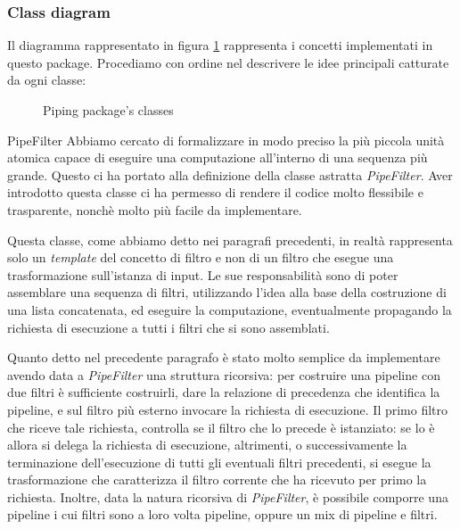 \subsubsection*{Class diagram}
Il diagramma rappresentato in figura \ref{fig:piping-package-classes}
rappresenta i concetti implementati in questo package. Procediamo con
ordine nel descrivere le idee principali catturate da ogni classe:

\begin{figure}
  \centering
  \caption{Piping package's classes}
  \label{fig:piping-package-classes}
\end{figure}

\begin{paragraph}{PipeFilter}
  Abbiamo cercato di formalizzare in modo preciso la pi\`u piccola
  unit\`a atomica capace di eseguire una computazione all'interno di
  una sequenza pi\`u grande. Questo ci ha portato alla definizione
  della classe astratta \emph{PipeFilter}. Aver introdotto questa
  classe ci ha permesso di rendere il codice molto flessibile e
  trasparente, nonch\`e molto pi\`u facile da implementare.

  Questa classe, come abbiamo detto nei paragrafi precedenti, in
  realt\`a rappresenta solo un \emph{template} del concetto di filtro
  e non di un filtro che esegue una trasformazione sull'istanza di
  input. Le sue responsabilit\`a sono di poter assemblare una sequenza
  di filtri, utilizzando l'idea alla base della costruzione di una
  lista concatenata, ed eseguire la computazione, eventualmente
  propagando la richiesta di esecuzione a tutti i filtri che si sono
  assemblati.

  Quanto detto nel precedente paragrafo \`e stato molto semplice da
  implementare avendo data a \emph{PipeFilter} una struttura
  ricorsiva: per costruire una pipeline con due filtri \`e sufficiente
  costruirli, dare la relazione di precedenza che identifica la
  pipeline, e sul filtro pi\`u esterno invocare la richiesta di
  esecuzione. Il primo filtro che riceve tale richiesta, controlla se
  il filtro che lo precede \`e istanziato: se lo \`e allora si delega
  la richiesta di esecuzione, altrimenti, o successivamente la
  terminazione dell'esecuzione di tutti gli eventuali filtri
  precedenti, si esegue la trasformazione che caratterizza il filtro
  corrente che ha ricevuto per primo la richiesta. Inoltre, data la
  natura ricorsiva di \emph{PipeFilter}, \`e possibile comporre una
  pipeline i cui filtri sono a loro volta pipeline, oppure un mix di
  pipeline e filtri.


\end{paragraph}
